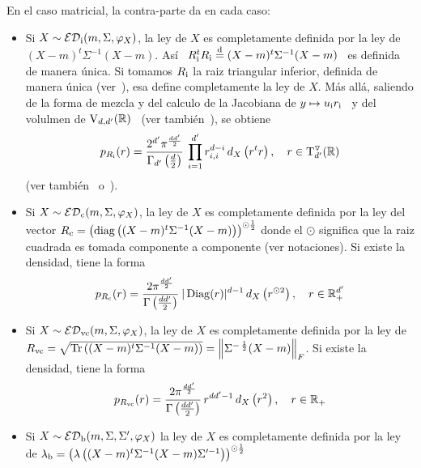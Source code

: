 \begin{itemize}
  En el caso matricial, la contra-parte da en cada caso:
  \begin{itemize}
  \item Si $X \sim \mathcal{ED}_{\mathrm{i}}(m,\Sigma,\varphi_X)$, la ley de $X$ es completamente
    definida por la ley de $(X-m)^t \Sigma^{-1} (X-m)$. As\'i \ $R_{\mathrm{i}}^t R_{\mathrm{i}}
    \stackrel{\mathrm{d}}{=}  (X-m)^t \Sigma^{-1}  (X-m)$ \  es  definida de  manera \'unica.   Si
    tomamos  $R_{\mathrm{i}}$ la raiz  triangular inferior,  definida de  manera \'unica
    (ver~\cite{HorJoh13, Bha97}), esa define  completamente la ley de $X$. M\'as
    all\'a, saliendo de la  forma de mezcla y del calculo de  la Jacobiana de $y
    \mapsto   u_{\mathrm{i}}  r_{\mathrm{i}}$~\cite[Teo.~2.1.13]{Mui82}   y   del  volulmen   de
    $\mathrm{V}_{d,d'}(\mathbb{R})$~\cite[Teo.~2.1.15]{Mui82}                           (ver
    tambi\'en~\cite[p.~15-17]{GuNag99}), se obtiene
    \[
    p_{R_{\mathrm{i}}}(r)   =   \frac{2^{d'}   \pi^{\frac{d   d'}{2}}}{\Gamma_{d'}\left(
        \frac{d}{2} \right)} \:  \prod_{i=1}^{d'} r_{i,i}^{d-i} \, d_X\left( r^t
      r \right), \quad r \in \mathrm{T}^\triangledown_{d'}(\mathbb{R})
    \]
    (ver tambi\'en~\cite[Teo.~7.9.2]{And03} o~\cite{Dia13}).
  \item Si $X \sim \mathcal{ED}_{\mathrm{c}}(m,\Sigma,\varphi_X)$, la ley de $X$ es completamente
    definida  por  la  ley  del  vector $R_{\mathrm{c}}  =  \left(  \operatorname{diag}\left(  (X-m)^t
        \Sigma^{-1}  (X-m)  \right) \right)^{\odot  \frac12}$  donde el  $\odot$
    significa  que la  raiz  cuadrada  es tomada  componente  a componente  (ver
    notaciones). Si existe la densidad, tiene la forma
    \[
    p_{R_{\mathrm{c}}}(r)  = \frac{2  \pi^{\frac{d d'}{2}}}{\Gamma\left(  \frac{d d'}{2}
      \right)} \: |\operatorname{Diag}(r)|^{d-1} \, d_X\left( r^{\odot 2} \right), \quad r \in
    \mathbb{R}_+^{d'}
    \]
  \item   Si  $X  \sim   \mathcal{ED}_{\mathrm{vc}}(m,\Sigma,\varphi_X)$,  la   ley  de   $X$  es
    completamente  definida por  la ley  de $R_{\mathrm{vc}}  =  \sqrt{\operatorname{Tr}\left( (X-m)^t
        \Sigma^{-1}  (X-m)  \right)}  =  \left\|  \Sigma^{-  \,  \frac12}  (X-m)
    \right\|_F$. Si existe la densidad, tiene la forma
    \[
    p_{R_{\mathrm{vc}}}(r) =  \frac{2 \pi^{\frac{d d'}{2}}}{\Gamma\left(  \frac{d d'}{2}
      \right)} \, r^{d d'-1} \, d_X\left( r^2 \right), \quad r \in \mathbb{R}_+
    \]
  \item  Si  $X \sim  \mathcal{ED}_{\mathrm{b}}(m,\Sigma,\Sigma',\varphi_X)$  la  ley  de $X$  es
    completamente definida  por la ley  de $\lambda_{\mathrm{b}} =  \left( \lambda\left(
        (X-m)^t \Sigma^{-1} (X-m)  \Sigma'^{-1} \right) \right)^{\odot \frac12}$

\end{itemize}
\end{itemize}
